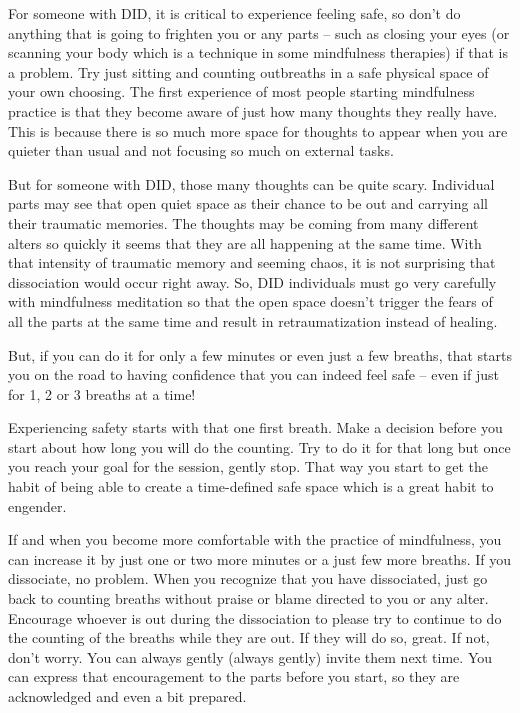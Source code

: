 \documentclass[]{book}
\begin{document}
For someone with DID, it is critical to experience feeling safe, so don't do anything that is going to frighten you or any parts -- such as closing your eyes (or scanning your body which is a technique in some mindfulness therapies) if that is a problem. Try just sitting and counting outbreaths in a safe physical space of your own choosing. The first experience of most people starting mindfulness practice is that they become aware of just how many thoughts they really have. This is because there is so much more space for thoughts to appear when you are quieter than usual and not focusing so much on external tasks.

But for someone with DID, those many thoughts can be quite scary. Individual parts may see that open quiet space as their chance to be out and carrying all their traumatic memories. The thoughts may be coming from many different alters so quickly it seems that they are all happening at the same time. With that intensity of traumatic memory and seeming chaos, it is not surprising that dissociation would occur right away. So, DID individuals must go very carefully with mindfulness meditation so that the open space doesn't trigger the fears of all the parts at the same time and result in retraumatization instead of healing.

But, if you can do it for only a few minutes or even just a few breaths, that starts you on the road to having confidence that you can indeed feel safe -- even if just for 1, 2 or 3 breaths at a time!

Experiencing safety starts with that one first breath. Make a decision before you start about how long you will do the counting. Try to do it for that long but once you reach your goal for the session, gently stop. That way you start to get the habit of being able to create a time-defined safe space which is a great habit to engender.

If and when you become more comfortable with the practice of mindfulness, you can increase it by just one or two more minutes or a just few more breaths. If you dissociate, no problem. When you recognize that you have dissociated, just go back to counting breaths without praise or blame directed to you or any alter. Encourage whoever is out during the dissociation to please try to continue to do the counting of the breaths while they are out. If they will do so, great. If not, don't worry. You can always gently (always gently) invite them next time. You can express that encouragement to the parts before you start, so they are acknowledged and even a bit prepared.
\end{document}

